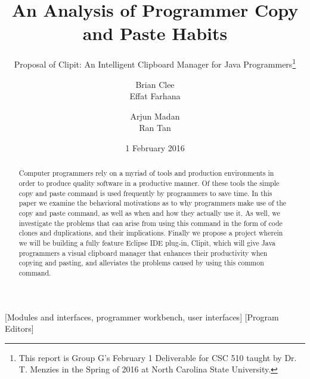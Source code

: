 \documentclass{acm_proc_article-sp}
\begin{document}
\title{An Analysis of Programmer Copy and Paste Habits}
\subtitle{Proposal of Clipit: An Intelligent Clipboard Manager for Java Programmers\thanks{This report is Group G's February 1 Deliverable for CSC 510 taught by Dr. T. Menzies in the Spring of 2016 at North Carolina State University.}}

\author{
\alignauthor
Brian Clee\\
\alignauthor
Effat Farhana\\
\and %
\alignauthor
Arjun Madan\\
\alignauthor
Ran Tan\\
}

\date{1 February 2016}
\maketitle

\begin{abstract}
Computer programmers rely on a myriad of tools and production environments in order to produce quality software in a productive manner. Of these tools the simple copy and paste command is used frequently by programmers to save time. In this paper we examine the behavioral motivations as to why programmers make use of the copy and paste command, as well as when and how they actually use it. As well, we investigate the problems that can arise from using this command in the form of code clones and duplications, and their implications. Finally we propose a project wherein we will be building a fully feature Eclipse IDE plug-in, Clipit, which will give Java programmers a visual clipboard manager that enhances their productivity when copying and pasting, and alleviates the problems caused by using this common command.
\end{abstract}

[Modules and interfaces, programmer workbench, user interfaces]
[Program Editors]

\end{document}
